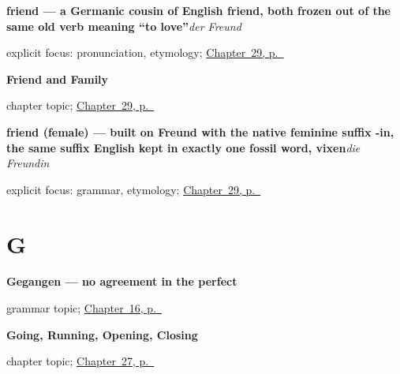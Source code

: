 \noindent\begin{minipage}[t]{\linewidth}
\raggedright
\textbf{friend — a Germanic cousin of English friend, both frozen out of the same old verb meaning \textquotedblleft{}to love\textquotedblright{}}\enspace\emph{der Freund}\par
\footnotesize explicit focus: pronunciation, etymology; \hyperref[ch:ge-friend-and-family]{Chapter~29, p.~\pageref*{ch:ge-friend-and-family}}
\end{minipage}\par\smallskip

\noindent\begin{minipage}[t]{\linewidth}
\raggedright
\textbf{Friend and Family}\par
\footnotesize chapter topic; \hyperref[ch:ge-friend-and-family]{Chapter~29, p.~\pageref*{ch:ge-friend-and-family}}
\end{minipage}\par\smallskip

\noindent\begin{minipage}[t]{\linewidth}
\raggedright
\textbf{friend (female) — built on Freund with the native feminine suffix -in, the same suffix English kept in exactly one fossil word, vixen}\enspace\emph{die Freundin}\par
\footnotesize explicit focus: grammar, etymology; \hyperref[ch:ge-friend-and-family]{Chapter~29, p.~\pageref*{ch:ge-friend-and-family}}
\end{minipage}\par\smallskip

\section*{G}

\noindent\begin{minipage}[t]{\linewidth}
\raggedright
\textbf{Gegangen — no agreement in the perfect}\par
\footnotesize grammar topic; \hyperref[ch:sein]{Chapter~16, p.~\pageref*{ch:sein}}
\end{minipage}\par\smallskip

\noindent\begin{minipage}[t]{\linewidth}
\raggedright
\textbf{Going, Running, Opening, Closing}\par
\footnotesize chapter topic; \hyperref[ch:ge-moving-verbs]{Chapter~27, p.~\pageref*{ch:ge-moving-verbs}}
\end{minipage}\par\smallskip

